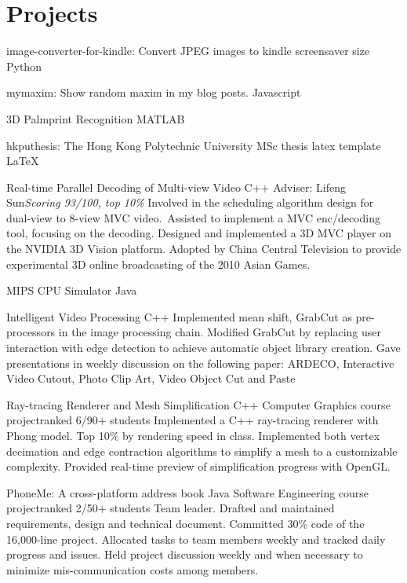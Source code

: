 \documentclass[11pt,a4paper]{moderncv/moderncv}
\begin{document}
\section{Projects}

{image-converter-for-kindle: Convert JPEG images to kindle screensaver size}
{Python}
{}{}
{
}

{mymaxim: Show random maxim in my blog posts.}
{Javascript}
{}{}
{
}

{3D Palmprint Recognition}
{MATLAB}
{}{}
{
}

{hkputhesis: The Hong Kong Polytechnic University MSc thesis latex template}
{LaTeX}
{}{}
{
}

{Real-time Parallel Decoding of Multi-view Video}
{C++}
{Adviser: Lifeng Sun}{\textit{Scoring 93/100, top 10\%}}
{
Involved in the scheduling algorithm design for dual-view to 8-view MVC video.\
Assisted to implement a MVC enc/decoding tool, focusing on the decoding.
Designed and implemented a 3D MVC player on the NVIDIA 3D Vision platform.
Adopted by China Central Television to provide experimental 3D online broadcasting of the 2010 Asian Games.
}

{MIPS CPU Simulator}
{Java}
{}{}
{
}

{Intelligent Video Processing}
{C++}
{}{}
{
Implemented mean shift, GrabCut as pre-processors in the image processing chain.
Modified GrabCut by replacing user interaction with edge detection to achieve automatic object library creation.
Gave presentations in weekly discussion on the following paper: ARDECO, Interactive Video Cutout, Photo Clip Art, Video Object Cut and Paste
}

{Ray-tracing Renderer and Mesh Simplification}
{C++}
{Computer Graphics course project}{ranked 6/90+ students}
{
Implemented a C++ ray-tracing renderer with Phong model.
Top 10\% by rendering speed in class.
Implemented both vertex decimation and edge contraction algorithms to simplify a mesh to a customizable complexity.
Provided real-time preview of simplification progress with OpenGL.\
}

{PhoneMe: A cross-platform address book}
{Java}
{Software Engineering course project}{ranked 2/50+ students}
{
Team leader.
Drafted and maintained requirements, design and technical document.
Committed 30\% code of the 16,000-line project.
Allocated tasks to team members weekly and tracked daily progress and issues.
Held project discussion weekly and when necessary to minimize mis-communication costs among members.
}
\end{document}
